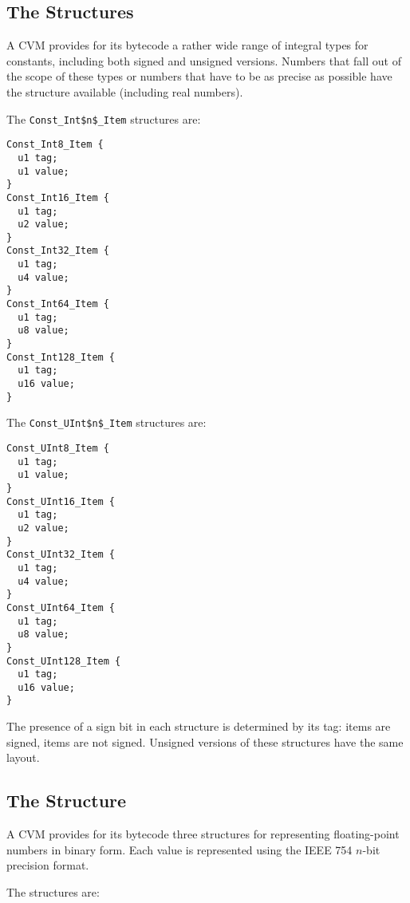 \subsection{The  Structures}

A CVM provides for its bytecode a rather wide range of integral types for constants, including both signed and unsigned versions. Numbers that fall out of the scope of these types or numbers that have to be as precise as possible have the  structure available (including real numbers).

The \lstinline!Const_Int$n$_Item! structures are:

\begin{minipage}{\linewidth}
\begin{lstlisting}
Const_Int8_Item {
  u1 tag;
  u1 value;
}
Const_Int16_Item {
  u1 tag;
  u2 value;
}
Const_Int32_Item {
  u1 tag;
  u4 value;
}
Const_Int64_Item {
  u1 tag;
  u8 value;
}
Const_Int128_Item {
  u1 tag;
  u16 value;
}
\end{lstlisting}
\end{minipage}

The \lstinline!Const_UInt$n$_Item! structures are:

\begin{minipage}{\linewidth}
\begin{lstlisting}
Const_UInt8_Item {
  u1 tag;
  u1 value;
}
Const_UInt16_Item {
  u1 tag;
  u2 value;
}
Const_UInt32_Item {
  u1 tag;
  u4 value;
}
Const_UInt64_Item {
  u1 tag;
  u8 value;
}
Const_UInt128_Item {
  u1 tag;
  u16 value;
}
\end{lstlisting}
\end{minipage}

The presence of a sign bit in each structure is determined by its tag:  items are signed,  items are not signed. Unsigned versions of these structures have the same layout. 





\subsection{The  Structure}

A CVM provides for its bytecode three structures for representing floating-point numbers in binary form. Each value is represented using the IEEE 754 $n$-bit precision format. 

The  structures are:


